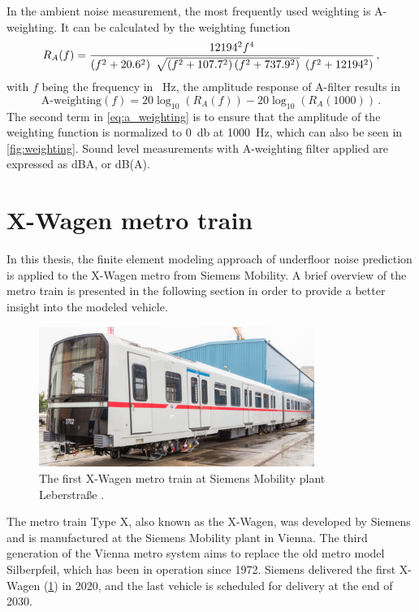 In the ambient noise measurement, the most frequently used weighting is A-weighting. It can be calculated by the weighting function \cite{IEC61672}
\begin{equation}
	 R_A(f) = {12194^2 f^4 \over \left(f^2 + 20.6^2\right)\ \sqrt{\left(f^2 + 107.7^2\right)\left(f^2 + 737.9^2\right)}\ \left(f^2 + 12194^2\right)}\,,
\end{equation}
with $f$ being the frequency in \SI{}{\hertz}, the amplitude response of A-filter results in
\begin{equation}
	\text{A-weighting}(f) = 20\log_{10}\left(R_A(f)\right) - 20\log_{10}\left(R_A(1000)\right) \,. \label{eq:a_weighting}
\end{equation}
The second term in \cref{eq:a_weighting} is to ensure that the amplitude of the weighting function is normalized to \SI{0}{\decibel} at \SI{1000}{\hertz}, which can also be seen in \cref{fig:weighting}. Sound level measurements with A-weighting filter applied are expressed as dBA, or dB(A).

\newpage
\section{X-Wagen metro train}
\label{section:ubx_geometry}

In this thesis, the finite element modeling approach of underfloor noise prediction is applied to the X-Wagen metro from Siemens Mobility. A brief overview of the metro train is presented in the following section in order to provide a better insight into the modeled vehicle.

\begin{figure}[H]
	\centering
	\includegraphics[width=0.8\textwidth]{fig/ubx_wiener_linien.PNG}
	\caption{The first X-Wagen metro train at Siemens Mobility plant Leberstraße \cite{foto_ubx}.}
	\label{fig:ubx_foto}
\end{figure}

The metro train Type X, also known as the X-Wagen, was developed by Siemens and is manufactured at the Siemens Mobility plant in Vienna. The third generation of the Vienna metro system aims to replace the old metro model Silberpfeil, which has been in operation since 1972. Siemens delivered the first X-Wagen (\cref{fig:ubx_foto}) in 2020, and the last vehicle is scheduled for delivery at the end of 2030.

